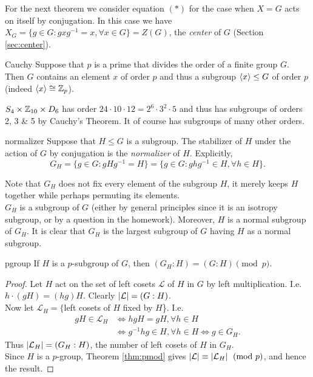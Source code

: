 For the next theorem we consider equation $(\ast)$ for the case when $X=G$ acts on itself by conjugation. In this case we have $X_G=\{g\in G:gxg^{-1}=x,\forall x\in G\}=Z(G)$, the \emph{center} of $G$ (Section \ref{sec:center}).

\begin{thm}{Cauchy}{}
Suppose that $p$ is a prime that divides the order of a finite group $G$. Then $ G$ contains an element $x$ of order $p$ and thus a subgroup $\left\langle x\right\rangle\le G$ of order $p$ (indeed $\left\langle x\right\rangle\cong\mathbb{Z}_p$).
\end{thm}


\begin{example}{}{}
$S_4\times \mathbb{Z}_{10}\times D_6$ has order $24\cdot 10\cdot 12=2^6\cdot 3^2\cdot 5$ and thus has subgroups of orders 2, 3 \& 5 by Cauchy's Theorem. It of course has subgroups of many other orders.
\end{example}


\begin{defn}{}{normalizer}
Suppose that $H\le G$ is a subgroup. The stabilizer of $H$ under the action of $G$ by conjugation is the \emph{normalizer} of $H$. Explicitly,
\[G_H=\{g\in G:gHg^{-1}=H\}=\{g\in G:ghg^{-1}\in H,\forall h\in H\}.\]
\end{defn}


Note that $G_H$ does not fix every element of the subgroup $H$, it merely keeps $H$ together while perhaps permuting its elements.\\
$G_H$ is a subgroup of $G$ (either by general principles since it is an isotropy subgroup, or by a question in the homework). Moreover, $H$ is a normal subgroup of $G_H$. It is clear that $G_H$ is the largest subgroup of $G$ having $H$ as a normal subgroup.


\begin{lemm}{}{pgroup}
If $H$ is a $p$-subgroup of $G$, then $(G_H:H)=(G:H)\pmod p$.
\end{lemm}

\begin{proof}
Let $H$ act on the set of left cosets $\mathcal L$ of $H$ in $G$ by left multiplication. I.e.~$h\cdot(gH)=(hg)H$. Clearly $\left| \mathcal L\right|=(G:H)$.\\
Now let $\mathcal L_H=\{$left cosets of $H$ fixed by $H$\}. I.e.
\begin{align*}
gH\in\mathcal L_H&\iff hgH=gH,\forall h\in H\\
&\iff g^{-1}hg\in H,\forall h\in H\iff g\in G_H.
\end{align*}
Thus $\left| \mathcal L_H\right|=(G_H:H)$, the number of left cosets of $H$ in $G_H$.\\
Since $H$ is a $p$-group, Theorem \ref{thm:pmod} gives $\left| \mathcal L\right|\equiv\left| \mathcal L_H\right|\pmod p$, and hence the result.
\end{proof}

